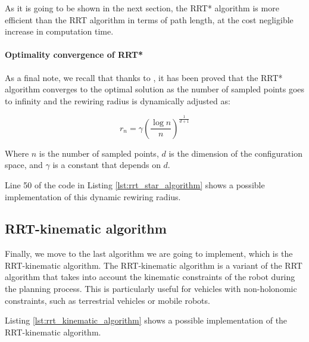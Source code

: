 As it is going to be shown in the next section, the RRT* algorithm is more efficient than the RRT algorithm in terms of path length, at the cost negligible increase in computation time.

\paragraph{Optimality convergence of RRT*}

As a final note, we recall that thanks to \cite{rrt_optimality}, it has been proved that the RRT* algorithm converges to the optimal solution as the number of sampled points goes to infinity and the rewiring radius is dynamically adjusted as:

\begin{equation}
    r_n = \gamma \left( \frac{\log{n}}{n} \right) ^ {\frac{1}{d+1}}
\end{equation}

Where $n$ is the number of sampled points, $d$ is the dimension of the configuration space, and $\gamma$ is a constant that depends on $d$.

Line 50 of the code in Listing \ref{lst:rrt_star_algorithm} shows a possible implementation of this dynamic rewiring radius.



\subsection{RRT-kinematic algorithm}
\label{subsec:rrt_kinematic_algorithm}

Finally, we move to the last algorithm we are going to implement, which is the RRT-kinematic algorithm.
The RRT-kinematic algorithm is a variant of the RRT algorithm that takes into account the kinematic constraints of the robot during the planning process.
This is particularly useful for vehicles with non-holonomic constraints, such as terrestrial vehicles or mobile robots.

Listing \ref{lst:rrt_kinematic_algorithm} shows a possible implementation of the RRT-kinematic algorithm.



